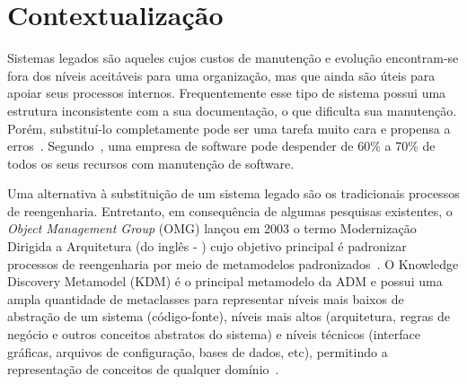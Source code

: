 
\section{Contextualização}\label{sec:contexto}

Sistemas legados são aqueles cujos custos de manutenção e evolução encontram-se fora dos níveis aceitáveis para uma organização, mas que ainda são úteis para apoiar seus processos internos. Frequentemente esse tipo de sistema possui uma estrutura inconsistente com a sua documentação, o que dificulta sua manutenção. Porém, substituí-lo completamente pode ser uma tarefa muito cara e propensa a erros~\cite{Pressman_2009}. Segundo~, uma empresa de software pode despender de 60\% a 70\% de todos os seus recursos com manutenção de software.


Uma alternativa à substituição de um sistema legado são os tradicionais processos de reengenharia. Entretanto, em consequência de algumas pesquisas existentes, o \textit{Object Management Group} (OMG) lançou em 2003 o termo Modernização Dirigida a Arquitetura (do inglês - ) cujo objetivo principal é padronizar processos de reengenharia por meio de metamodelos padronizados~\cite{ADM:OMG}. O Knowledge Discovery Metamodel (KDM) é o principal metamodelo da ADM e possui uma ampla quantidade de metaclasses para representar níveis mais baixos de abstração de um sistema (código-fonte), níveis mais altos (arquitetura, regras de negócio e outros conceitos abstratos do sistema) e níveis técnicos (interface gráficas, arquivos de configuração, bases de dados, etc), permitindo a representação de conceitos de qualquer domínio~\cite{KDM:specification,KDM:ISO}. %
 
